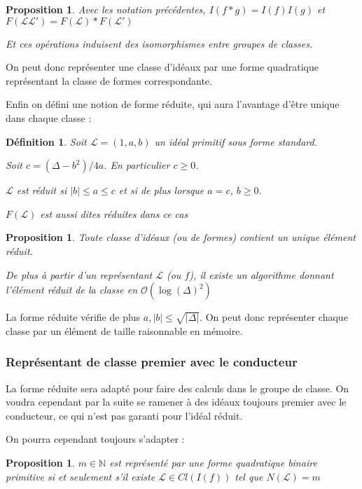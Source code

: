 \documentclass{article}
\newcommand{\N}[0]{\mathbb{N}}
\newcommand{\OR}[0]{\mathcal{O}}
\newcommand{\LR}[0]{\mathcal{L}}
\newtheorem{Prop}[The]{Proposition}
\newtheorem{Def}[The]{Définition}
\begin{document}
\begin{Prop}
	Avec les notation précédentes, $I(f*g) = I(f)I(g)$ et $F(\LR\LR') = F(\LR)*F(\LR')$
	
	Et ces opérations induisent des isomorphismes entre groupes de classes.
\end{Prop}

On peut donc représenter une classe d'idéaux par une forme quadratique représentant la classe de formes correspondante.

Enfin on défini une notion de forme réduite, qui aura l'avantage d'être unique dans chaque classe :

\begin{Def}
	Soit $\LR = (1,a,b)$ un idéal primitif sous forme standard.
	
	Soit $c = (\Delta - b^2)/4a$. En particulier $c\geq0$.
	
	$\LR$ est réduit si $|b| \leq a \leq c$ et si de plus lorsque $a = c$, $b \geq 0$.
	
	$F(\LR)$ est aussi dites réduites dans ce cas
\end{Def}

\begin{Prop}
	Toute classe d'idéaux (ou de formes) contient un unique élément réduit. 
	
	De plus à partir d'un représentant $\LR$ (ou $f$), il existe un algorithme donnant l'élément réduit de la classe en $\OR(\log(\Delta)^{2} )$
\end{Prop}

La forme réduite vérifie de plus $a,|b| \leq \sqrt{|\Delta|}$. On peut donc représenter chaque classe par un élément de taille raisonnable en mémoire.

\subsubsection{Représentant de classe premier avec le conducteur}

La forme réduite sera adapté pour faire des calculs dans le groupe de classe. On voudra cependant par la suite se ramener à des idéaux toujours premier avec le conducteur, ce qui n'est pas garanti pour l'idéal réduit.

On pourra cependant toujours s'adapter :

\begin{Prop}
	$m\in\N$ est représenté par une forme quadratique binaire primitive si et seulement s'il existe $\LR\in Cl(I(f))$ tel que $N(\LR) = m$
\end{Prop}
\end{document}
